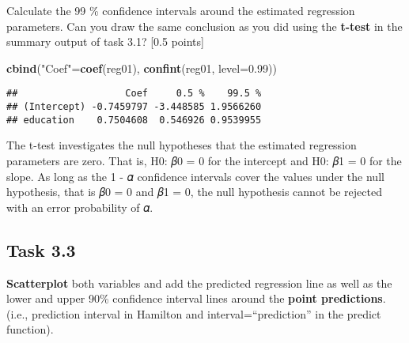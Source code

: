 \documentclass[
]{article}
\newenvironment{Shaded}{\begin{snugshade}}{\end{snugshade}}
\newcommand{\DataTypeTok}[1]{\textcolor[rgb]{0.13,0.29,0.53}{#1}}
\newcommand{\FloatTok}[1]{\textcolor[rgb]{0.00,0.00,0.81}{#1}}
\newcommand{\KeywordTok}[1]{\textcolor[rgb]{0.13,0.29,0.53}{\textbf{#1}}}
\newcommand{\NormalTok}[1]{#1}
\newcommand{\StringTok}[1]{\textcolor[rgb]{0.31,0.60,0.02}{#1}}
\begin{document}
Calculate the 99 \% confidence intervals around the estimated regression
parameters. Can you draw the same conclusion as you did using the
\textbf{t-test} in the summary output of task 3.1? {[}0.5 points{]}

\begin{Shaded}
\begin{Highlighting}[]
\KeywordTok{cbind}\NormalTok{(}\StringTok{"Coef"}\NormalTok{=}\KeywordTok{coef}\NormalTok{(reg01), }\KeywordTok{confint}\NormalTok{(reg01, }\DataTypeTok{level=}\FloatTok{0.99}\NormalTok{))}
\end{Highlighting}
\end{Shaded}

\begin{verbatim}
##                   Coef     0.5 %    99.5 %
## (Intercept) -0.7459797 -3.448585 1.9566260
## education    0.7504608  0.546926 0.9539955
\end{verbatim}

The t-test investigates the null hypotheses that the estimated
regression parameters are zero. That is, H0: 𝛽0 = 0 for the intercept
and H0: 𝛽1 = 0 for the slope. As long as the 1 - 𝛼 confidence intervals
cover the values under the null hypothesis, that is 𝛽0 = 0 and 𝛽1 = 0,
the null hypothesis cannot be rejected with an error probability of 𝛼.

\hypertarget{task-3.3}{%
\subsection{Task 3.3}\label{task-3.3}}

\textbf{Scatterplot} both variables and add the predicted regression
line as well as the lower and upper 90\% confidence interval lines
around the \textbf{point predictions}.(i.e., prediction interval in
Hamilton and interval=``prediction'' in the predict function).
\end{document}
